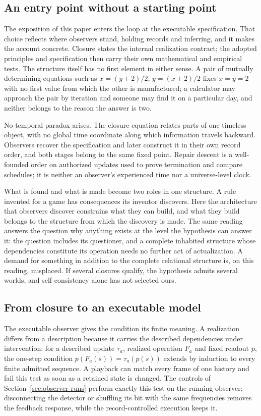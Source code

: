 \documentclass[11pt]{article}
\theoremstyle{definition}
\theoremstyle{remark}
\begin{document}
\subsection{An entry point without a starting point}

The exposition of this paper enters the loop at the executable
specification. That choice reflects where observers stand, holding records
and inferring, and it makes the account concrete. Closure states the internal
realization contract; the adopted principles and specification then carry
their own mathematical and empirical tests. The structure itself has no
first element in either sense. A pair of mutually determining
equations such as $x=(y+2)/2$, $y=(x+2)/2$ fixes $x=y=2$ with no first value
from which the other is manufactured; a calculator may approach the pair by
iteration and someone may find it on a particular day, and neither belongs
to the reason the answer is two.

No temporal paradox arises. The closure equation relates parts of one
timeless object, with no global time coordinate along which information
travels backward. Observers recover the specification and later construct
it in their own record order, and both stages belong to the same fixed
point. Repair descent is a well-founded order on authorized updates used to
prove termination and compare schedules; it is neither an observer's
experienced time nor a universe-level clock.

What is found and what is made become two roles in one structure. A rule
invented for a game has consequences its inventor discovers. Here the
architecture that observers discover constrains what they can build, and
what they build belongs to the structure from which the discovery is made.
The same reading answers the question why anything exists at the level the
hypothesis can answer it: the question includes its questioner, and a
complete inhabited structure whose dependencies constitute its operation
needs no further act of actualization. A demand for
something in addition to the complete relational structure is, on this
reading, misplaced. If several closures qualify, the hypothesis admits
several worlds, and self-consistency alone has not selected ours.

\subsection{From closure to an executable model}
\label{sec:closure-to-model}

The executable observer gives the condition its finite meaning. A
realization differs from a description because it carries the described
dependencies under intervention: for a described update $\tau_a$, realized operation $F_a$ and fixed readout $p$, the one-step condition $p(F_a(s))=\tau_a(p(s))$ extends by induction to every finite admitted sequence. A playback can match every frame of one history and fail
this test as soon as a retained state is changed. The controls of
Section~\ref{sec:observer-runs} perform exactly this test on the running
observer: disconnecting the detector or shuffling its bit with the same
frequencies removes the feedback response, while the record-controlled
execution keeps it.
\end{document}
